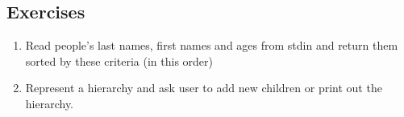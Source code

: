  
\subsection{Exercises}
\begin{enumerate}
 \item{ Read people's last names, first names and ages from stdin and return them sorted by these criteria (in this order)}
 \item{ Represent a hierarchy and ask user to add new children or print out the hierarchy. }
\end{enumerate}
